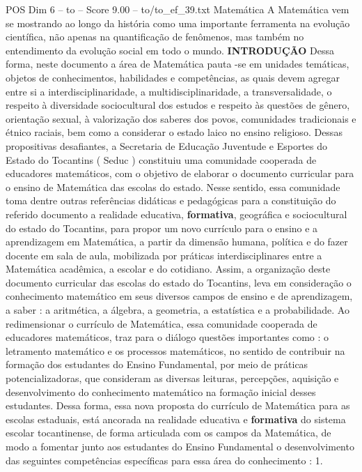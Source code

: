 \begin{textsample}{POS Dim 6 – to – Score 9.00 – to/to\_ef\_39.txt}  \label{ex:f6_pos_172}
Matemática A Matemática vem se mostrando ao longo da história como uma importante ferramenta na evolução científica, não apenas na quantificação de fenômenos, mas também no entendimento da evolução social em todo o mundo. \textbf{INTRODUÇÃO} Dessa forma, neste documento a área de Matemática pauta -se em unidades temáticas, objetos de conhecimentos, habilidades e competências, as quais devem agregar entre si a interdisciplinaridade, a multidisciplinaridade, a transversalidade, o respeito à diversidade sociocultural dos estudos e respeito às questões de gênero, orientação sexual, à valorização dos saberes dos povos, comunidades tradicionais e étnico raciais, bem como a considerar o estado laico no ensino religioso.
Dessas propositivas desafiantes, a Secretaria de Educação Juventude e Esportes do Estado do Tocantins ( Seduc ) constituiu uma comunidade cooperada de educadores matemáticos, com o objetivo de elaborar o documento curricular para o ensino de Matemática das escolas do estado.
Nesse sentido, essa comunidade toma dentre outras referências didáticas e pedagógicas para a constituição do referido documento a realidade educativa, \textbf{formativa}, geográfica e sociocultural do estado do Tocantins, para propor um novo currículo para o ensino e a aprendizagem em Matemática, a partir da dimensão humana, política e do fazer docente em sala de aula, mobilizada por práticas interdisciplinares entre a Matemática acadêmica, a escolar e do cotidiano.
Assim, a organização deste documento curricular das escolas do estado do Tocantins, leva em consideração o conhecimento matemático em seus diversos campos de ensino e de aprendizagem, a saber : a aritmética, a álgebra, a geometria, a estatística e a probabilidade.
Ao redimensionar o currículo de Matemática, essa comunidade cooperada de educadores matemáticos, traz para o diálogo questões importantes como : o letramento matemático e os processos matemáticos, no sentido de contribuir na formação dos estudantes do Ensino Fundamental, por meio de práticas potencializadoras, que consideram as diversas leituras, percepções, aquisição e desenvolvimento do conhecimento matemático na formação inicial desses estudantes.
Dessa forma, essa nova proposta do currículo de Matemática para as escolas estaduais, está ancorada na realidade educativa e \textbf{formativa} do sistema escolar tocantinense, de forma articulada com os campos da Matemática, de modo a fomentar junto aos estudantes do Ensino Fundamental o desenvolvimento das seguintes competências específicas para essa área do conhecimento : 1.

\end{textsample}
